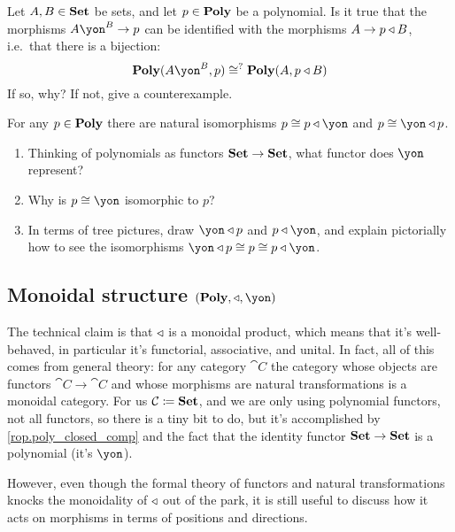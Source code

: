 \documentclass[Book-Poly]{subfiles}
\begin{document}
\begin{exercise}
Let $A,B\in\mathbf{Set}$ be sets, and let $p\in\mathbf{Poly}$ be a polynomial. Is it true that the morphisms $A\yon^B\to p$ can be identified with the morphisms $A\to p\mathbin{\triangleleft} B$, i.e.\ that there is a bijection:
\begin{equation}\label{eqn.monomials_and_comp}
	\poly(A\yon^B,p)\cong^?\poly(A,p\tri B)
\end{equation}
If so, why? If not, give a counterexample.
\end{exercise}

\begin{exercise}\label{ex.compose_yon}
For any $p\in\mathbf{Poly}$ there are natural isomorphisms $p\cong p\tri \yon$ and $p\cong\yon\tri p$.
\begin{enumerate}
	\item Thinking of polynomials as functors $\mathbf{Set}\to\mathbf{Set}$, what functor does $\yon$ represent?
	\item Why is $p\cong\yon$ isomorphic to $p$?
	\item In terms of tree pictures, draw $\yon\tri p$ and $p\tri\yon$, and explain pictorially how to see the isomorphisms $\yon\tri p\cong p\cong p\tri\yon$.
\qedhere
\end{enumerate}
\end{exercise}

\subsection{Monoidal structure $(\poly,\tri,\yon)$}\label{subsec.monoidal_struc_tri}

The technical claim is that $\mathbin{\triangleleft}$ is a monoidal product, which means that it's well-behaved, in particular it's functorial, associative, and unital. In fact, all of this comes from general theory: for any category $\cat{C}$ the category whose objects are functors $\cat{C}\to\cat{C}$ and whose morphisms are natural transformations is a monoidal category. For us $\mathcal{C}\coloneqq\mathbf{Set}$, and we are only using polynomial functors, not all functors, so there is a tiny bit to do, but it's accomplished by \cref{rop.poly_closed_comp} and the fact that the identity functor $\mathbf{Set}\to\mathbf{Set}$ is a polynomial (it's $\yon$).

However, even though the formal theory of functors and natural transformations knocks the monoidality of $\mathbin{\triangleleft}$ out of the park, it is still useful to discuss how it acts on morphisms in terms of positions and directions.
\end{document}

